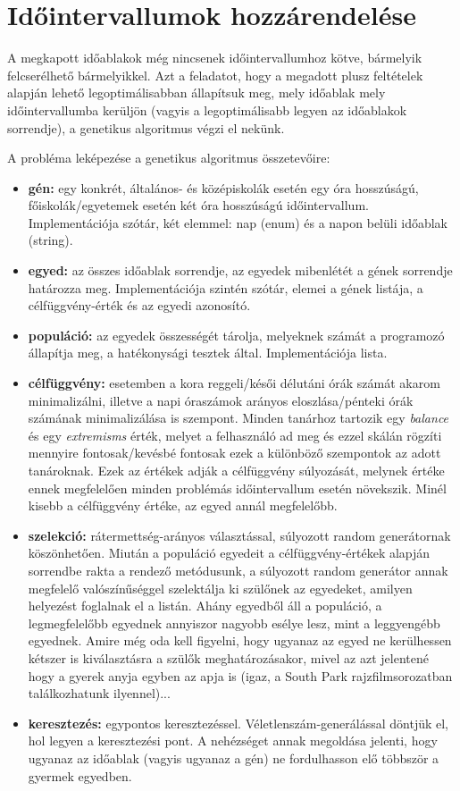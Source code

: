 \documentclass[a4paper,12pt]{article}
\begin{document}
\section{Időintervallumok hozzárendelése}

A megkapott időablakok még nincsenek időintervallumhoz kötve, bármelyik felcserélhető bármelyikkel. Azt a feladatot, hogy a megadott plusz feltételek alapján lehető legoptimálisabban állapítsuk meg, mely időablak mely időintervallumba kerüljön (vagyis a legoptimálisabb legyen az időablakok sorrendje), a genetikus algoritmus végzi el nekünk.

\noindent A probléma leképezése a genetikus algoritmus összetevőire:
\begin{itemize}
    \item \textbf{gén:} egy konkrét, általános- és középiskolák esetén egy óra hosszúságú, 	          főiskolák/egyetemek esetén két óra hosszúságú időintervallum. Implementációja szótár, két elemmel: nap (enum) és a napon belüli időablak (string).
    \item \textbf{egyed:} az összes időablak sorrendje, az egyedek mibenlétét a gének sorrendje határozza meg. Implementációja szintén szótár, elemei a gének listája, a célfüggvény-érték és az
egyedi azonosító.
    \item \textbf{populáció:} az egyedek összességét tárolja, melyeknek számát a programozó állapítja meg, a hatékonysági tesztek által. Implementációja lista.
    \item \textbf{célfüggvény:} esetemben a kora reggeli/késői délutáni órák számát akarom minimalizálni, illetve a napi óraszámok arányos eloszlása/pénteki órák számának minimalizálása is szempont. Minden tanárhoz tartozik egy \textsl{balance} és egy \textsl{extremisms} érték,
melyet a felhasználó ad meg és ezzel skálán rögzíti mennyire fontosak/kevésbé fontosak ezek a különböző szempontok az adott tanároknak. Ezek az értékek adják a célfüggvény súlyozását, melynek értéke ennek megfelelően minden problémás időintervallum esetén növekszik. Minél kisebb a célfüggvény értéke, az egyed annál megfelelőbb.
    \item \textbf{szelekció:} rátermettség-arányos választással, súlyozott random generátornak köszönhetően. Miután a populáció egyedeit a célfüggvény-értékek alapján sorrendbe rakta a rendező metódusunk, a súlyozott random generátor annak megfelelő valószínűséggel szelektálja ki szülőnek az egyedeket, amilyen helyezést foglalnak el a listán. Ahány egyedből áll a populáció, a legmegfelelőbb egyednek annyiszor nagyobb esélye lesz, mint a leggyengébb egyednek. Amire még oda kell figyelni, hogy ugyanaz az egyed ne kerülhessen kétszer is kiválasztásra a szülők meghatározásakor, mivel az azt jelentené hogy a gyerek anyja egyben az apja is (igaz, a South Park rajzfilmsorozatban találkozhatunk ilyennel)...
    \item \textbf{keresztezés:} egypontos keresztezéssel. Véletlenszám-generálással döntjük el, hol legyen a keresztezési pont. A nehézséget annak megoldása jelenti, hogy ugyanaz az időablak (vagyis ugyanaz a gén) ne fordulhasson elő többször a gyermek egyedben.
\end{itemize}
\end{document}
